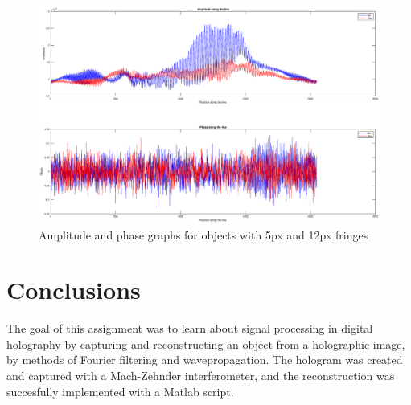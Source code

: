 \documentclass[12pt,a4paper,english
]{tunithesis}
\begin{document}
\begin{figure}
  \centering
  \includegraphics[width=\columnwidth]{img/lines.eps}
  \caption{Amplitude and phase graphs for objects with 5px and 12px fringes}
  \label{fig:lines}
\end{figure}



\chapter{Conclusions}
\label{ch:conclusions}
The goal of this assignment was to learn about signal processing in digital holography by capturing and reconstructing an object from a holographic image, by methods of Fourier filtering and wavepropagation. The hologram was created and captured with a Mach-Zehnder interferometer, and the reconstruction was succesfully implemented with a Matlab script.


%
%
\newpage

\printbibliography[title=References]
\appendix
\pagestyle{headings}

%
%
\def\appA{APPENDIX} %
\end{document}

